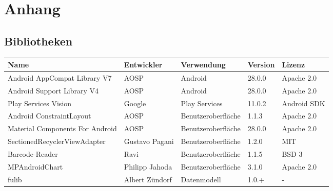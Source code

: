 \section{Anhang}\label{sec:bib}

\subsection{Bibliotheken}\label{subsec:bibliotheken}

\begin{table}[h]
    \renewcommand{\arraystretch}{1.1}

    \begin{tabularx}{\textwidth}{|X|l|l|l|l|}
        \hline
        \textbf{Name} & \textbf{Entwickler} & \textbf{Verwendung} & \textbf{Version} & \textbf{Lizenz} \\
        [0.5ex] \hline
        Android AppCompat Library V7 & AOSP & Android & 28.0.0 & Apache 2.0\\    %
        Android Support Library V4 & AOSP & Android & 28.0.0 & Apache 2.0\\   %
        \hline

        Play Services Vision & Google & Play Services & 11.0.2 & Android SDK\\  %
        \hline

        Android ConstraintLayout & AOSP & Benutzeroberfläche & 1.1.3 & Apache 2.0\\   %
        Material Components For Android & AOSP & Benutzeroberfläche & 28.0.0 & Apache 2.0\\  %
        SectionedRecyclerViewAdapter & Gustavo Pagani & Benutzeroberfläche & 1.2.0 & MIT\\   %
        Barcode-Reader & Ravi & Benutzeroberfläche & 1.1.5 & BSD 3\\   %
        MPAndroidChart & Philipp Jahoda & Benutzeroberfläche & 3.1.0 & Apache 2.0\\  %
        \hline

        fulib & Albert Zündorf & Datenmodell & 1.0.+ & -\\    %
        \hline


\end{tabularx}
\end{table}
